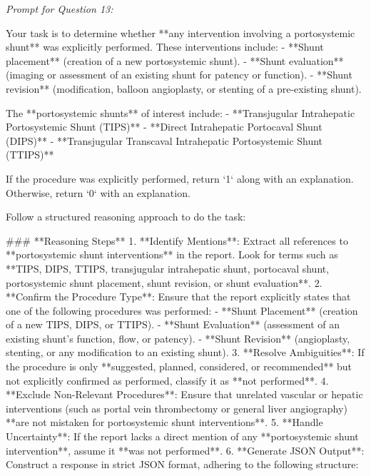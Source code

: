 \textit{\normalsize Prompt for Question  13:}
\begin{mdframed}[]
\normalsize

Your task is to determine whether **any intervention involving a portosystemic shunt** was explicitly performed. These interventions include:  
- **Shunt placement** (creation of a new portosystemic shunt).  
- **Shunt evaluation** (imaging or assessment of an existing shunt for patency or function).  
- **Shunt revision** (modification, balloon angioplasty, or stenting of a pre-existing shunt).  

The **portosystemic shunts** of interest include:  
- **Transjugular Intrahepatic Portosystemic Shunt (TIPS)**  
- **Direct Intrahepatic Portocaval Shunt (DIPS)**  
- **Transjugular Transcaval Intrahepatic Portosystemic Shunt (TTIPS)**  

If the procedure was explicitly performed, return `1` along with an explanation. Otherwise, return `0` with an explanation.

Follow a structured reasoning approach to do the task:

### **Reasoning Steps**  
1. **Identify Mentions**: Extract all references to **portosystemic shunt interventions** in the report. Look for terms such as **TIPS, DIPS, TTIPS, transjugular intrahepatic shunt, portocaval shunt, portosystemic shunt placement, shunt revision, or shunt evaluation**.  
2. **Confirm the Procedure Type**: Ensure that the report explicitly states that one of the following procedures was performed:  
   - **Shunt Placement** (creation of a new TIPS, DIPS, or TTIPS).  
   - **Shunt Evaluation** (assessment of an existing shunt’s function, flow, or patency).  
   - **Shunt Revision** (angioplasty, stenting, or any modification to an existing shunt).  
3. **Resolve Ambiguities**: If the procedure is only **suggested, planned, considered, or recommended** but not explicitly confirmed as performed, classify it as **not performed**.  
4. **Exclude Non-Relevant Procedures**: Ensure that unrelated vascular or hepatic interventions (such as portal vein thrombectomy or general liver angiography) **are not mistaken for portosystemic shunt interventions**.  
5. **Handle Uncertainty**: If the report lacks a direct mention of any **portosystemic shunt intervention**, assume it **was not performed**.  
6. **Generate JSON Output**: Construct a response in strict JSON format, adhering to the following structure:  

\end{mdframed}

